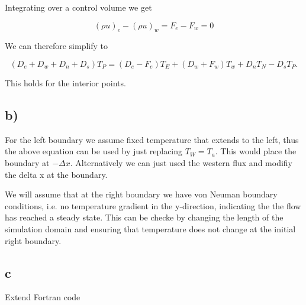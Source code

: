 \documentclass{article}
\begin{document}
Integrating over a control volume we get

\begin{equation}
(\rho u)_e - (\rho u)_w  = F_e - F_w = 0
\end{equation}

We can therefore simplify to

\begin{equation}
(D_e + D_w + D_n + D_s) T_P = (D_e - F_e) T_E + (D_w+F_w) T_w + D_n T_N - D_s T_P.
\end{equation}

This holds for the interior points.

\subsection{b)}

For the left boundary we assume fixed temperature that extends to the left, thus the above equation can be used by just replacing $T_W = T_a$. This would place the boundary at $-\Delta x$. Alternatively we can just used the western flux and modifiy the delta x at the boundary.

We will assume that at the right boundary we have von Neuman boundary conditions, i.e. no temperature gradient in the y-direction, indicating the the flow has reached a steady state. This can be checke by changing the length of the simulation domain and ensuring that temperature does not change at the initial right boundary.

\subsection{c}

Extend Fortran code
\end{document}
